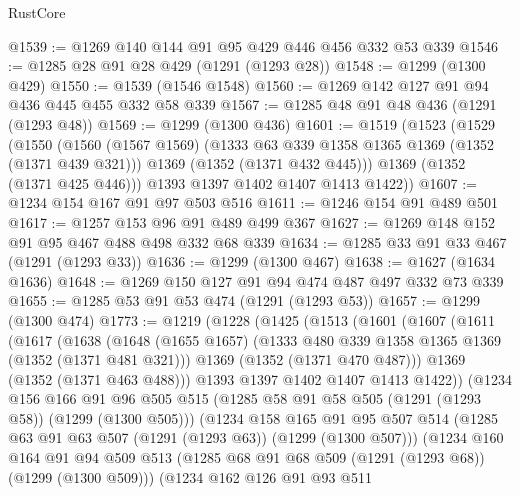 \begin{lexlean}{RustCore}
\begin{coremodule}
@1539 := @1269 @140 @144 @91 @95 @429 @446 @456 @332 @53 @339
@1546 := @1285 @28 @91 @28 @429 (@1291 (@1293 @28))
@1548 := @1299 (@1300 @429)
@1550 := @1539 (@1546 @1548)
@1560 := @1269 @142 @127 @91 @94 @436 @445 @455 @332 @58 @339
@1567 := @1285 @48 @91 @48 @436 (@1291 (@1293 @48))
@1569 := @1299 (@1300 @436)
@1601 := @1519
    (@1523
      (@1529
        (@1550
          (@1560
            (@1567 @1569)
            (@1333 @63 @339 @1358 @1365 @1369 (@1352 (@1371 @439 @321)))
            @1369
            (@1352 (@1371 @432 @445)))
          @1369
          (@1352 (@1371 @425 @446)))
        @1393
        @1397
        @1402
        @1407
        @1413
        @1422))
@1607 := @1234 @154 @167 @91 @97 @503 @516
@1611 := @1246 @154 @91 @489 @501
@1617 := @1257 @153 @96 @91 @489 @499 @367
@1627 := @1269 @148 @152 @91 @95 @467 @488 @498 @332 @68 @339
@1634 := @1285 @33 @91 @33 @467 (@1291 (@1293 @33))
@1636 := @1299 (@1300 @467)
@1638 := @1627 (@1634 @1636)
@1648 := @1269 @150 @127 @91 @94 @474 @487 @497 @332 @73 @339
@1655 := @1285 @53 @91 @53 @474 (@1291 (@1293 @53))
@1657 := @1299 (@1300 @474)
@1773 := @1219
    (@1228
      (@1425
        (@1513
          (@1601
            (@1607
              (@1611
                (@1617
                  (@1638
                    (@1648
                      (@1655 @1657)
                      (@1333 @480 @339 @1358 @1365 @1369 (@1352 (@1371 @481 @321)))
                      @1369
                      (@1352 (@1371 @470 @487)))
                    @1369
                    (@1352 (@1371 @463 @488)))
                  @1393
                  @1397
                  @1402
                  @1407
                  @1413
                  @1422))
              (@1234
                @156
                @166
                @91
                @96
                @505
                @515
                (@1285 @58 @91 @58 @505 (@1291 (@1293 @58)) (@1299 (@1300 @505)))
                (@1234
                  @158
                  @165
                  @91
                  @95
                  @507
                  @514
                  (@1285 @63 @91 @63 @507 (@1291 (@1293 @63)) (@1299 (@1300 @507)))
                  (@1234
                    @160
                    @164
                    @91
                    @94
                    @509
                    @513
                    (@1285 @68 @91 @68 @509 (@1291 (@1293 @68)) (@1299 (@1300 @509)))
                    (@1234
                      @162
                      @126
                      @91
                      @93
                      @511

\end{coremodule}
\end{lexlean}
